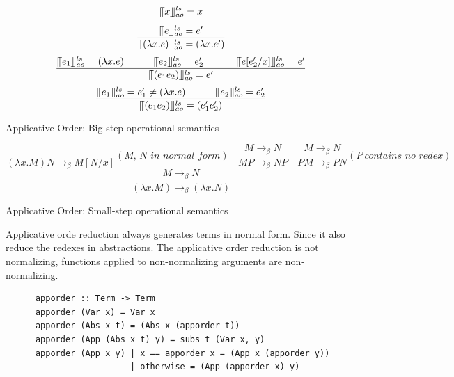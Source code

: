 \documentclass[a4paper,11pt,twoside]{report}
\begin{document}
\begin{equation*}
\llceil x \rrfloor ^{ls} _{ao} = x
\end{equation*}
\begin{equation*}
\frac{\llceil e \rrfloor ^{ls} _{ao} = e'}{\llceil (\lambda x.e) \rrfloor ^{ls} _{ao} = (\lambda x.e')}
\end{equation*}
\begin{equation*}
\frac{\llceil e_1 \rrfloor ^{ls} _{ao} = (\lambda x.e)\ \ \ \ \ \ \ \ \ \llceil e_2 \rrfloor ^{ls} _{ao} = e'_2\ \ \ \ \ \ \ \ \ \ \llceil e[e'_2/x] \rrfloor ^{ls} _{ao} = e'}{\llceil (e_1e_2) \rrfloor ^{ls} _{ao} = e'}
\end{equation*}
\begin{equation*}
\frac{\llceil e_1 \rrfloor ^{ls} _{ao} = e'_1\neq (\lambda x.e)\ \ \ \ \ \ \ \ \ \llceil e_2 \rrfloor ^{ls} _{ao} = e'_2}{\llceil (e_1e_2) \rrfloor ^{ls} _{ao} = (e'_1e'_2)}
\end{equation*}
\begin{center}
Applicative Order: Big-step operational semantics
\end{center}

\begin{equation*}
\frac{}{(\lambda x.M)N \rightarrow _\beta M[N/x]}(\textit{M, N in normal form})\ \ \ \ 
\frac{M \rightarrow _\beta N}{MP \rightarrow _\beta NP}\ \ \ \ 
\frac{M \rightarrow _\beta N}{PM \rightarrow _\beta PN}(P\ \textit{contains no redex})\ \ \ \ 
\end{equation*}
\begin{equation*}
\frac{M \rightarrow _\beta N}{(\lambda x.M) \rightarrow _\beta (\lambda x.N)}
\end{equation*}
\begin{center}
Applicative Order: Small-step operational semantics
\end{center}

Applicative orde reduction always generates terms in normal form. Since it also reduce the redexes in abstractions. The applicative order reduction is not normalizing, functions applied to non-normalizing arguments are non-normalizing.



\begin{verbatim}
      apporder :: Term -> Term
      apporder (Var x) = Var x
      apporder (Abs x t) = (Abs x (apporder t))
      apporder (App (Abs x t) y) = subs t (Var x, y)
      apporder (App x y) | x == apporder x = (App x (apporder y))
                         | otherwise = (App (apporder x) y)  
\end{verbatim}
\end{document}
